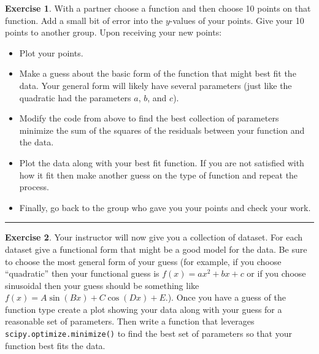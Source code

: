 \documentclass[
]{book}
\providecommand{\tightlist}{%
  \setlength{\itemsep}{0pt}\setlength{\parskip}{0pt}}
\theoremstyle{definition}
\theoremstyle{definition}
\theoremstyle{definition}
\newtheorem{exercise}{Exercise}[chapter]
\theoremstyle{remark}
\begin{document}
\begin{exercise}
\protect\hypertarget{exr:unnamed-chunk-247}{}{\label{exr:unnamed-chunk-247} }With a partner choose a function and then choose 10 points on that function. Add a small bit of error into the \(y\)-values of your points. Give your 10 points to another group. Upon receiving your new points:

\begin{itemize}
\tightlist
\item
  Plot your points.
\item
  Make a guess about the basic form of the function that might best fit the data. Your general form will likely have several parameters (just like the quadratic had the parameters \(a\), \(b\), and \(c\)).\\
\item
  Modify the code from above to find the best collection of parameters minimize the sum of the squares of the residuals between your function and the data.\\
\item
  Plot the data along with your best fit function. If you are not satisfied with how it fit then make another guess on the type of function and repeat the process.
\item
  Finally, go back to the group who gave you your points and check your work.
\end{itemize}
\end{exercise}

\begin{center}\rule{0.5\linewidth}{0.5pt}\end{center}

\begin{exercise}
\protect\hypertarget{exr:unnamed-chunk-248}{}{\label{exr:unnamed-chunk-248} }Your instructor will now give you a collection of dataset. For each dataset give a functional form that might be a good model for the data. Be sure to choose the most general form of your guess (for example, if you choose ``quadratic'' then your functional guess is \(f(x) = ax^2 + bx + c\) or if you choose sinusoidal then your guess should be something like \(f(x) = A\sin(Bx) + C\cos(Dx) + E\).). Once you have a guess of the function type create a plot showing your data along with your guess for a reasonable set of parameters. Then write a function that leverages \texttt{scipy.optimize.minimize()} to find the best set of parameters so that your function best fits the data.
\end{exercise}
\end{document}
